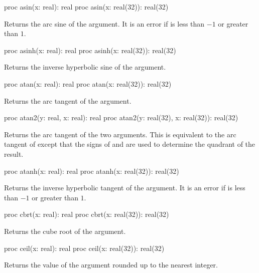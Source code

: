 \begin{protohead}
proc asin(x: real): real
proc asin(x: real(32)): real(32)
\end{protohead}
\begin{protobody}
Returns the arc sine of the argument.  It is an error if  is
less than $-1$ or greater than $1$.
\end{protobody}

\begin{protohead}
proc asinh(x: real): real
proc asinh(x: real(32)): real(32)
\end{protohead}
\begin{protobody}
Returns the inverse hyperbolic sine of the argument.
\end{protobody}

\begin{protohead}
proc atan(x: real): real
proc atan(x: real(32)): real(32)
\end{protohead}
\begin{protobody}
Returns the arc tangent of the argument.
\end{protobody}

\begin{protohead}
proc atan2(y: real, x: real): real
proc atan2(y: real(32), x: real(32)): real(32)
\end{protohead}
\begin{protobody}
Returns the arc tangent of the two arguments.  This is equivalent to
the arc tangent of  except that the signs of 
and  are used to determine the quadrant of the result.
\end{protobody}

\begin{protohead}
proc atanh(x: real): real
proc atanh(x: real(32)): real(32)
\end{protohead}
\begin{protobody}
Returns the inverse hyperbolic tangent of the argument.  It is an error
if  is less than $-1$ or greater than $1$.
\end{protobody}

\begin{protohead}
proc cbrt(x: real): real
proc cbrt(x: real(32)): real(32)
\end{protohead}
\begin{protobody}
Returns the cube root of the argument.
\end{protobody}

\begin{protohead}
proc ceil(x: real): real
proc ceil(x: real(32)): real(32)
\end{protohead}
\begin{protobody}
Returns the value of the argument rounded up to the nearest integer.
\end{protobody}

